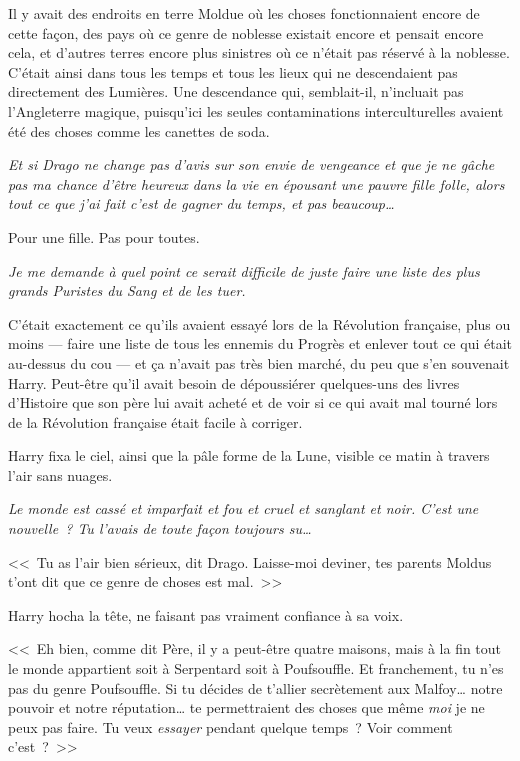 Il y avait des endroits en terre Moldue où les choses fonctionnaient encore de cette façon, des pays où ce genre de noblesse existait encore et pensait encore cela, et d'autres terres encore plus sinistres où ce n'était pas réservé à la noblesse. C'était ainsi dans tous les temps et tous les lieux qui ne descendaient pas directement des Lumières. Une descendance qui, semblait-il, n'incluait pas l'Angleterre magique, puisqu'ici les seules contaminations interculturelles avaient été des choses comme les canettes de soda.

\emph{Et si Drago ne change pas d'avis sur son envie de vengeance et que je ne gâche pas ma chance d'être heureux dans la vie en épousant une pauvre fille folle, alors tout ce que j'ai fait c'est de gagner du temps, et pas beaucoup…}

Pour une fille. Pas pour toutes.

\emph{Je me demande à quel point ce serait difficile de juste faire une liste des plus grands Puristes du Sang et de les tuer.}

C'était exactement ce qu'ils avaient essayé lors de la Révolution française, plus ou moins — faire une liste de tous les ennemis du Progrès et enlever tout ce qui était au-dessus du cou — et ça n'avait pas très bien marché, du peu que s'en souvenait Harry. Peut-être qu'il avait besoin de dépoussiérer quelques-uns des livres d'Histoire que son père lui avait acheté et de voir si ce qui avait mal tourné lors de la Révolution française était facile à corriger.

Harry fixa le ciel, ainsi que la pâle forme de la Lune, visible ce matin à travers l'air sans nuages.

\emph{Le monde est cassé et imparfait et fou et cruel et sanglant et noir. C'est une nouvelle~? Tu l'avais de toute façon toujours su…}

<<~Tu as l'air bien sérieux, dit Drago. Laisse-moi deviner, tes parents Moldus t'ont dit que ce genre de choses est mal.~>>

Harry hocha la tête, ne faisant pas vraiment confiance à sa voix.

<<~Eh bien, comme dit Père, il y a peut-être quatre maisons, mais à la fin tout le monde appartient soit à Serpentard soit à Poufsouffle. Et franchement, tu n'es pas du genre Poufsouffle. Si tu décides de t'allier secrètement aux Malfoy… notre pouvoir et notre réputation… te permettraient des choses que même \emph{moi} je ne peux pas faire. Tu veux \emph{essayer} pendant quelque temps~? Voir comment c'est~?~>>

